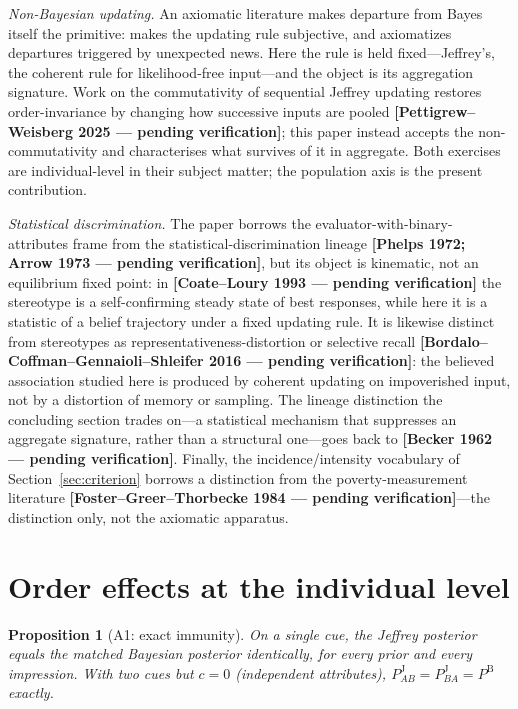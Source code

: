 \documentclass[review,12pt,authoryear]{elsarticle}
\newtheorem{proposition}{Proposition}
\theoremstyle{remark}
\theoremstyle{definition}
\newcommand{\PB}{P^{\mathrm{B}}}
\newcommand{\PJ}{P^{\mathrm{J}}}
\newcommand{\anchor}[1]{}
\newcommand{\pcite}[1]{\textbf{[#1 --- pending verification]}}
\begin{document}
\emph{Non-Bayesian updating.} An axiomatic literature makes departure from Bayes itself the
primitive: \citet{Epstein2006} makes the updating rule subjective, and \citet{Ortoleva2012}
axiomatizes departures triggered by unexpected news. Here the rule is held fixed---Jeffrey's,
the coherent rule for likelihood-free input---and the object is its aggregation signature. Work
on the commutativity of sequential Jeffrey updating restores order-invariance by changing how
successive inputs are pooled \pcite{Pettigrew--Weisberg 2025}; this paper instead accepts the
non-commutativity and characterises what survives of it in aggregate. Both exercises are
individual-level in their subject matter; the population axis is the present contribution.

\emph{Statistical discrimination.} The paper borrows the evaluator-with-binary-attributes frame
from the statistical-discrimination lineage \pcite{Phelps 1972; Arrow 1973}, but its object is
kinematic, not an equilibrium fixed point: in \pcite{Coate--Loury 1993} the stereotype is a
self-confirming steady state of best responses, while here it is a statistic of a belief
trajectory under a fixed updating rule. It is likewise distinct from stereotypes as
representativeness-distortion or selective recall \pcite{Bordalo--Coffman--Gennaioli--Shleifer
2016}: the believed association studied here is produced by coherent updating on impoverished
input, not by a distortion of memory or sampling. The lineage distinction the concluding section
trades on---a statistical mechanism that suppresses an aggregate signature, rather than a
structural one---goes back to \pcite{Becker 1962}. Finally, the incidence/intensity vocabulary
of Section~\ref{sec:criterion} borrows a distinction from the poverty-measurement literature
\pcite{Foster--Greer--Thorbecke 1984}---the distinction only, not the axiomatic apparatus.

\section{Order effects at the individual level}
\label{sec:individual}

\begin{proposition}[A1: exact immunity]\label{prop:A1}
On a single cue, the Jeffrey posterior equals the matched Bayesian posterior identically, for
every prior and every impression. With two cues but $c=0$ (independent attributes),
$\PJ_{AB}=\PJ_{BA}=\PB$ exactly. \anchor{Prop.~A1}
\end{proposition}
\end{document}
